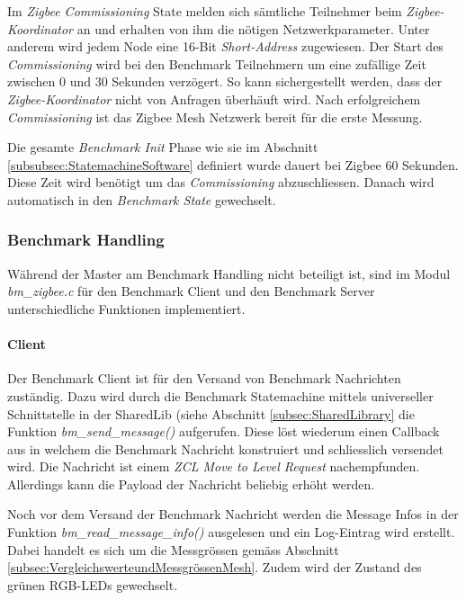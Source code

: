 Im \textit{Zigbee Commissioning} State melden sich sämtliche Teilnehmer beim \textit{Zigbee-Koordinator} an und erhalten von ihm die nötigen Netzwerkparameter.
Unter anderem wird jedem Node eine 16-Bit \textit{Short-Address} zugewiesen.
Der Start des \textit{Commissioning} wird bei den Benchmark Teilnehmern um eine zufällige Zeit zwischen 0 und 30 Sekunden verzögert.
So kann sichergestellt werden, dass der \textit{Zigbee-Koordinator} nicht von Anfragen überhäuft wird.
Nach erfolgreichem \textit{Commissioning} ist das Zigbee Mesh Netzwerk bereit für die erste Messung.

Die gesamte \textit{Benchmark Init} Phase wie sie im Abschnitt \ref{subsubsec:StatemachineSoftware} definiert wurde dauert bei Zigbee 60 Sekunden.
Diese Zeit wird benötigt um das \textit{Commissioning} abzuschliessen.
Danach wird automatisch in den \textit{Benchmark State} gewechselt.

\subsubsection{Benchmark Handling}\label{subsubsec:ZigbeeBenchmarkHandling}
Während der Master am Benchmark Handling nicht beteiligt ist,  sind im Modul \textit{bm\_zigbee.c} für den Benchmark Client und den Benchmark Server unterschiedliche Funktionen implementiert.

\paragraph{Client}
Der Benchmark Client ist für den Versand von Benchmark Nachrichten zuständig.
Dazu wird durch die Benchmark Statemachine mittels universeller Schnittstelle in der SharedLib (siehe Abschnitt \ref{subsec:SharedLibrary} die Funktion \textit{bm\_send\_message()} aufgerufen.
Diese löst wiederum einen Callback aus in welchem die Benchmark Nachricht konstruiert und schliesslich versendet wird.
Die Nachricht ist einem \textit{ZCL Move to Level Request} nachempfunden.
Allerdings kann die Payload der Nachricht beliebig erhöht werden.

Noch vor dem Versand der Benchmark Nachricht werden die Message Infos in der Funktion \textit{bm\_read\_message\_info()} ausgelesen und ein Log-Eintrag wird erstellt.
Dabei handelt es sich um die Messgrössen gemäss Abschnitt \ref{subsec:VergleichswerteundMessgrössenMesh}.
Zudem wird der Zustand des grünen RGB-LEDs gewechselt.

